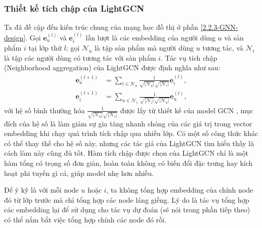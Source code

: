 \subsubsection{Thiết kế tích chập của LightGCN}
\noindent Ta đã đề cập đến kiến trúc chung của mạng học đồ thị ở phần \ref{2.2.3-GNN-design}. Gọi $\mathbf{e}_u^{(l)}$ và $\mathbf{e}_i^{(l)}$ lần lượt là các embedding của người dùng $u$ và sản phẩm $i$ tại lớp thứ $l$; gọi $\mathcal{N}_u$ là tập sản phẩm mà người dùng $u$ tương tác, và $\mathcal{N}_i$ là tập các người dùng có tương tác với sản phẩm $i$. Tác vụ tích chập (Neighborhood aggregation) của LightGCN được định nghĩa như sau:
\begin{equation}
    \begin{aligned}
        \mathbf{e}_u^{(l+1)} & = \sum_{i \in \mathcal{N}_u}{\frac{1}{\sqrt{|\mathcal{N}_u|} \sqrt{|\mathcal{N}_i|}} \mathbf{e}_i^{(l)}}, \\
        \mathbf{e}_i^{(l+1)} & = \sum_{u \in \mathcal{N}_i}{\frac{1}{\sqrt{|\mathcal{N}_i|} \sqrt{|\mathcal{N}_u|}} \mathbf{e}_u^{(l)}},
    \end{aligned}
    \label{lightgcn-neiagg}
\end{equation}
với hệ số bình thường hóa $\frac{1}{\sqrt{|\mathcal{N}_u|} \sqrt{|\mathcal{N}_i|}}$ được lấy từ thiết kế của model GCN \cite{GCN-model}, mục đích của hệ số là làm giảm sự gia tăng nhanh chóng của các giá trị trong vector embedding khi chạy quá trình tích chập qua nhiều lớp. Có một số công thức khác có thể thay thế cho hệ số này, nhưng các tác giả của LightGCN tìm hiểu thấy là cách làm này cũng đủ tốt. Hàm tích chập được chọn của LightGCN chỉ là một hàm tổng có trọng số đơn giản, hoàn toàn không có biến đổi đặc trưng hay kích hoạt phi tuyến gì cả, giúp model nhẹ hơn nhiều.

Để ý kỹ là với mỗi node $u$ hoặc $i$, ta không tổng hợp embedding của chính node đó từ lớp trước mà chỉ tổng hợp các node láng giềng. Lý do là tác vụ tổng hợp các embedding lại để sử dụng cho tác vụ dự đoán (sẽ nói trong phần tiếp theo) có thể nắm bắt việc tổng hợp chính các node đó rồi.

